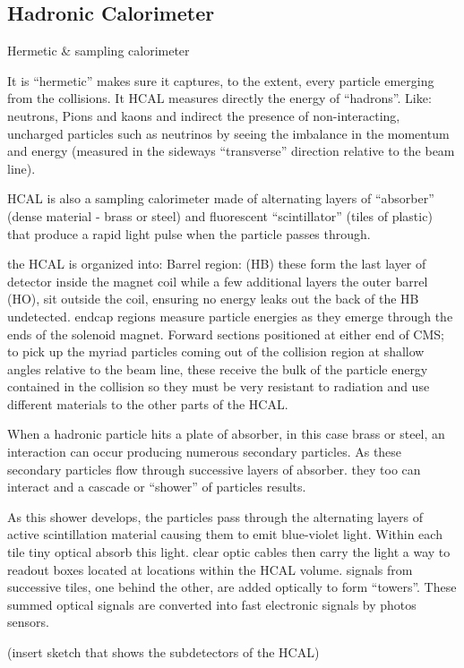 \subsection{Hadronic Calorimeter}

Hermetic & sampling calorimeter 

It is “hermetic” makes sure it captures, to the extent, every particle emerging from the collisions. It HCAL measures directly the energy of “hadrons”. Like: neutrons, Pions and kaons and indirect the presence of non-interacting, uncharged particles such as neutrinos by seeing the imbalance in the momentum and energy (measured in the sideways “transverse” direction relative to the beam line). 

HCAL is also a sampling calorimeter made of alternating layers of “absorber” (dense material - brass or steel) and fluorescent “scintillator” (tiles of plastic) that produce a rapid light pulse when the particle passes through.

the HCAL is organized into: Barrel region: (HB) these form the last layer of detector inside the magnet coil while a few additional layers the outer barrel (HO), sit outside the coil, ensuring no energy leaks out the back of the HB undetected. endcap regions measure particle energies as they emerge through the ends of the solenoid magnet. Forward sections positioned at either end of CMS; to pick up the myriad particles coming out of the collision region at shallow angles relative to the beam line, these receive the bulk of the particle energy contained in the collision so they must be very resistant to radiation and use different materials to the other parts of the HCAL.

When a hadronic particle hits a plate of absorber, in this case brass or steel, an interaction can occur producing numerous secondary particles. As these secondary particles flow through successive layers of absorber. they too can interact and a cascade or “shower” of particles results. 

As this shower develops, the particles pass through the alternating layers of active scintillation material causing them to emit blue-violet light. Within each tile tiny optical absorb this light. clear optic cables then carry the light a way to readout boxes located at locations within the HCAL volume. signals from successive tiles, one behind the other, are added optically to form “towers”. These summed optical signals are converted into fast electronic signals by photos sensors. 

(insert sketch that shows the subdetectors of the HCAL)


